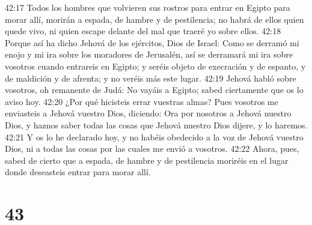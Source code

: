 42:17 Todos los hombres que volvieren sus rostros para entrar en Egipto para morar allí, morirán a espada, de hambre y de pestilencia; no habrá de ellos quien quede vivo, ni quien escape delante del mal que traeré yo sobre ellos.  
42:18 Porque así ha dicho Jehová de los ejércitos, Dios de Israel: Como se derramó mi enojo y mi ira sobre los moradores de Jerusalén, así se derramará mi ira sobre vosotros cuando entrareis en Egipto; y seréis objeto de execración y de espanto, y de maldición y de afrenta; y no veréis más este lugar.  
42:19 Jehová habló sobre vosotros, oh remanente de Judá: No vayáis a Egipto; sabed ciertamente que os lo aviso hoy.  
42:20 ¿Por qué hicisteis errar vuestras almas? Pues vosotros me enviasteis a Jehová vuestro Dios, diciendo: Ora por nosotros a Jehová nuestro Dios, y haznos saber todas las cosas que Jehová nuestro Dios dijere, y lo haremos.  
42:21 Y os lo he declarado hoy, y no habéis obedecido a la voz de Jehová vuestro Dios, ni a todas las cosas por las cuales me envió a vosotros.  
42:22 Ahora, pues, sabed de cierto que a espada, de hambre y de pestilencia moriréis en el lugar donde deseasteis entrar para morar allí.  

\chapter{43}

